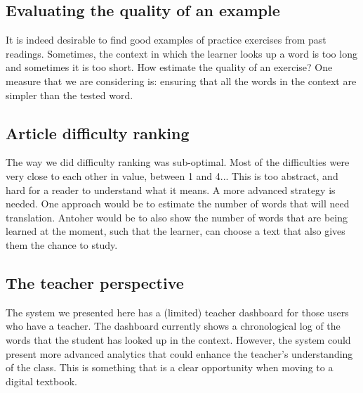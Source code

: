 

\subsection{Evaluating the quality of an example}

It is indeed desirable to find good examples of practice exercises from past readings. Sometimes, the context in which the learner looks up a word is too long and sometimes it is too short. How estimate the quality of an exercise? One measure that we are considering is: ensuring that all the words in the context are simpler than the tested word. 


\subsection{Article difficulty ranking}
The way we did difficulty ranking was sub-optimal. Most of the difficulties were very close to each other in value, between 1 and 4... This is too abstract, and hard for a reader to understand what it means. A more advanced strategy is needed. One approach would be to estimate the number of words that will need translation. Antoher would be to also show the number of words that are being learned at the moment, such that the learner, can choose a text that also gives them the chance to study. 

\subsection{The teacher perspective}
The system we presented here has a (limited) teacher dashboard for those users who have a teacher. The dashboard currently shows a chronological log of the words that the student has looked up in the context. However, the system could present more advanced analytics that could enhance the teacher's understanding of the class. This is something that is a clear opportunity when moving to a digital textbook. 

